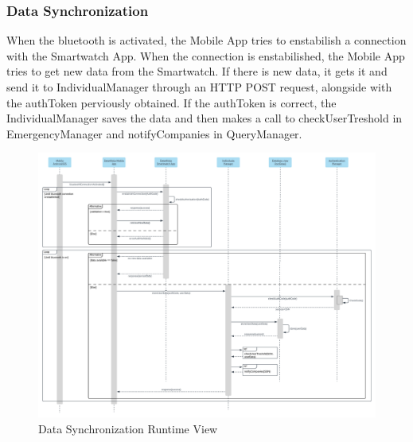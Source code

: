 \subsubsection{Data Synchronization}
When the bluetooth is activated, the Mobile App tries to enstabilish a connection with the Smartwatch App. When the connection is enstabilished, the Mobile App tries to get new data from the Smartwatch. If there is new data, it gets it and send it to IndividualManager through an HTTP POST request, alongside with the authToken perviously obtained. If the authToken is correct, the IndividualManager saves the data and then makes a call to checkUserTreshold in EmergencyManager and notifyCompanies in QueryManager.
\begin{figure}[H]
	\includegraphics[width=\textwidth,height=\textheight,keepaspectratio]{assets/flowCharts/DataSynchronizationSmartwatchSmartphone.pdf}
	\caption{Data Synchronization Runtime View}
	\label{fig:DataSynchronizationSmartwatchSmartphone}
\end{figure}

